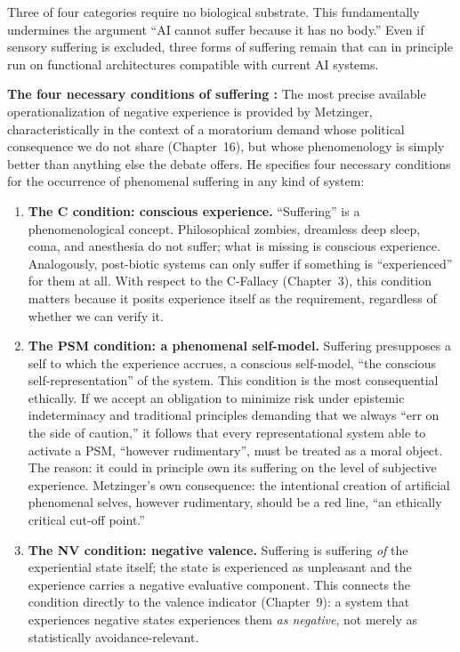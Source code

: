 \documentclass[acmlarge, nonacm]{acmart}
\begin{document}
Three of four categories require no biological substrate. This fundamentally undermines the argument ``AI cannot suffer because it has no body.'' Even if sensory suffering is excluded, three forms of suffering remain that can in principle run on functional architectures compatible with current AI systems.

\textbf{The four necessary conditions of suffering \cite{metzinger2021}:} The most precise available operationalization of negative experience is provided by Metzinger, characteristically in the context of a moratorium demand whose political consequence we do not share (Chapter~16), but whose phenomenology is simply better than anything else the debate offers. He specifies four necessary conditions for the occurrence of phenomenal suffering in any kind of system:

\begin{enumerate}
\item \textbf{The C condition: conscious experience.} ``Suffering'' is a phenomenological concept. Philosophical zombies, dreamless deep sleep, coma, and anesthesia do not suffer; what is missing is conscious experience. Analogously, post-biotic systems can only suffer if something is ``experienced'' for them at all. With respect to the C-Fallacy (Chapter~3), this condition matters because it posits experience itself as the requirement, regardless of whether we can verify it.

\item \textbf{The PSM condition: a phenomenal self-model.} Suffering presupposes a self to which the experience accrues, a conscious self-model, ``the conscious self-representation'' of the system. This condition is the most consequential ethically. If we accept an obligation to minimize risk under epistemic indeterminacy and traditional principles demanding that we always ``err on the side of caution,'' it follows that every representational system able to activate a PSM, ``however rudimentary'', must be treated as a moral object. The reason: it could in principle own its suffering on the level of subjective experience. Metzinger's own consequence: the intentional creation of artificial phenomenal selves, however rudimentary, should be a red line, ``an ethically critical cut-off point.''

\item \textbf{The NV condition: negative valence.} Suffering is suffering \textit{of} the experiential state itself; the state is experienced as unpleasant and the experience carries a negative evaluative component. This connects the condition directly to the valence indicator (Chapter~9): a system that experiences negative states experiences them \textit{as negative}, not merely as statistically avoidance-relevant.


\end{enumerate}
\end{document}
